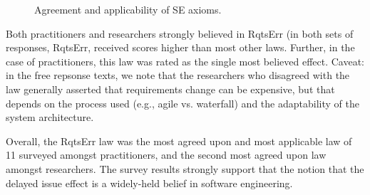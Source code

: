 \begin{figure}[!ht]
\caption{Agreement and applicability of SE axioms.}
\label{fig:survey_results}
\end{figure}

Both  practitioners and researchers  strongly believed in RqtsErr (in both sets of responses, RqtsErr, received  scores higher than most
other laws. Further, in the case of practitioners, this law was rated
as the single most believed effect. 
Caveat: in the free repsonse texts, we note that the researchers who disagreed with the law generally asserted that requirements change can be expensive, but that depends on the process used (e.g., agile vs. waterfall) and the adaptability of the system architecture.

Overall, the RqtsErr law was the most agreed upon and most applicable law of 11 surveyed amongst practitioners, and the second most agreed upon law amongst researchers. The survey results strongly support that the notion that the  delayed issue effect   is a widely-held belief in software engineering.